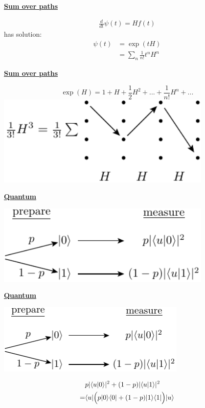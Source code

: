 \documentclass[11pt]{article}
\def\heading #1{\centerline{\underline{\bf\LARGE #1}}}
\def\vsp {\vskip 0.5cm}
\def\ket #1{|#1\rangle}
\def\bra #1{\langle#1|}
\def\braket #1#2{\langle#1|#2\rangle}
\begin{document}
\heading{Sum over paths}

\begin{align*}
\frac{d}{dt} \psi(t) = H f(t)
\end{align*}
has solution:
\begin{align*}
\psi(t) &= \exp(tH) \\
  &= \sum_{n} \frac{1}{n!} t^n H^n
\end{align*}

\newpage %

\heading{Sum over paths}

\vsp
$$
\exp(H) = 1 + H + \frac{1}{2}H^2 + ... + \frac{1}{n!} H^n + ...
$$
\vsp
\includegraphics[width=0.8\textwidth]{pic-exp.pdf}


\newpage %

\heading{Quantum}
\vsp
\includegraphics[width=0.8\textwidth]{pic-quantum.pdf}

\newpage %

\heading{Quantum}
\vsp
\centerline{\includegraphics[width=0.7\textwidth]{pic-quantum.pdf}}
\vsp
\begin{align*}
&p|\braket{u}{0}|^2 + (1-p)|\braket{u}{1}|^2 \\
=& \bra{u}\Bigl( p\ket{0}\bra{0} + (1-p)\ket{1}\bra{1} \Bigr ) \ket{u}
\end{align*}
\end{document}
